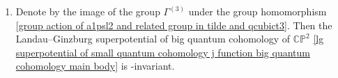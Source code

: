 \begin{Theorem}
\begin{enumerate}
The coefficients  belong to the following ring
.

 In addition, the correspondent Abelian differential $\phi$ is given by
\begin{gather}\label{volume form of Big quantum cohomology 1 Milanov deformation section}
\phi=-\frac{2^{\frac{5}{2}}}{2\pi}\frac{\Delta^{\frac{1}{6}}\bigl(\tilde\tau_{12}, Q^{\frac{1}{3}}t^3 \bigr)}{Q^{\frac{1}{6}}}{\rm d}\tilde\tau_{12},
\end{gather}
where $\Delta\bigl(\tilde\tau_{12}, Q^{\frac{1}{3}}t^3 \bigr)$ is defined in \eqref{modular deformation tilde 0}.

\item[$(2)$]
Denote by  the image of the group $\Gamma^{(3)}$ under the group homomorphism \eqref{group action of a1psl2 and related group in tilde and qcubict3}. Then the Landau--Ginzburg superpotential of big quantum cohomology of $\mathbb{CP}^2$ \eqref{lg superpotential of small quantum cohomology j function big quantum cohomology main body} is -invariant.
\end{enumerate}

\end{Theorem}

